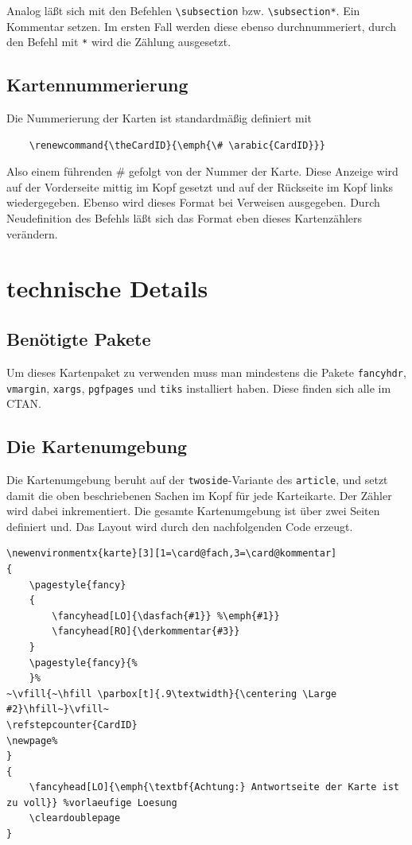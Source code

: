 \documentclass[a4paper]{article}
\begin{document}
Analog läßt sich mit den Befehlen \lstinline!\subsection! bzw. \lstinline!\subsection*!. Ein Kommentar setzen. Im ersten Fall werden diese ebenso durchnummeriert, durch den Befehl mit \lstinline!*! wird die Zählung ausgesetzt.

\subsection{Kartennummerierung}
Die Nummerierung der Karten ist standardmäßig definiert mit 
\begin{lstlisting}
	\renewcommand{\theCardID}{\emph{\# \arabic{CardID}}}
\end{lstlisting}
Also einem führenden \# gefolgt von der Nummer der Karte. Diese Anzeige wird auf der Vorderseite mittig im Kopf gesetzt und auf der Rückseite im Kopf links wiedergegeben. Ebenso wird dieses Format bei Verweisen ausgegeben. Durch Neudefinition des Befehls läßt sich das Format eben dieses Kartenzählers verändern.
%
%
%
\section{technische Details}
\subsection{Benötigte Pakete}
Um dieses Kartenpaket zu verwenden muss man mindestens die Pakete \lstinline!fancyhdr!, \lstinline!vmargin!, \lstinline!xargs!, \lstinline!pgfpages! und \lstinline!tiks! installiert haben. Diese finden sich alle im CTAN.
\subsection{Die Kartenumgebung}
Die Kartenumgebung beruht auf der \lstinline!twoside!-Variante des \lstinline!article!, und setzt damit die oben beschriebenen Sachen im Kopf für jede Karteikarte. Der Zähler wird dabei inkrementiert. Die gesamte Kartenumgebung ist über zwei Seiten definiert und. Das Layout wird durch den nachfolgenden Code erzeugt.
\newpage
\begin{lstlisting}[title=Die Kartenumgebung]
\newenvironmentx{karte}[3][1=\card@fach,3=\card@kommentar]
{
	\pagestyle{fancy}
	{
		\fancyhead[LO]{\dasfach{#1}} %\emph{#1}}
		\fancyhead[RO]{\derkommentar{#3}}
	}
	\pagestyle{fancy}{% 
	}%
~\vfill{~\hfill \parbox[t]{.9\textwidth}{\centering \Large #2}\hfill~}\vfill~
\refstepcounter{CardID}
\newpage%
}
{
	\fancyhead[LO]{\emph{\textbf{Achtung:} Antwortseite der Karte ist zu voll}} %vorlaeufige Loesung
	\cleardoublepage
}
\end{lstlisting}
\end{document}
